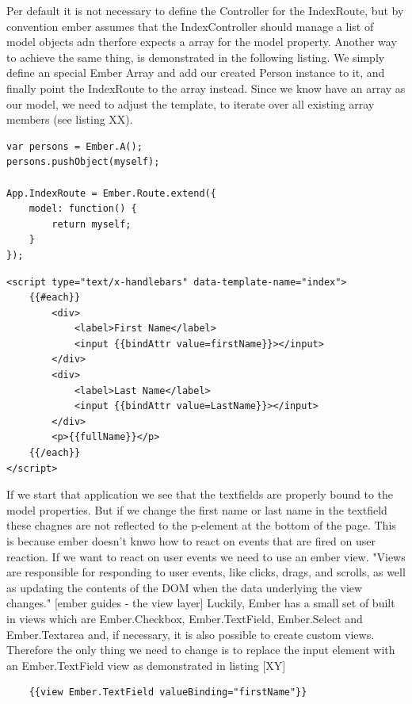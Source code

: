 Per default it is not necessary to define the Controller for the IndexRoute, but by convention ember assumes that the IndexController should manage a list of model objects adn therfore expects a array for the model property. Another way to achieve the same thing, is demonstrated in the following listing. We simply define an special Ember Array and add our created Person instance to it, and finally point the IndexRoute to the array instead. Since we know have an array as our model, we need to adjust the template, to iterate over all existing array members (see listing XX).

\begin{lstlisting}[caption=app.js]
var persons = Ember.A();
persons.pushObject(myself);

App.IndexRoute = Ember.Route.extend({
    model: function() {
        return myself;
    }
});

\end{lstlisting}     

\begin{lstlisting}[caption=index.html]
<script type="text/x-handlebars" data-template-name="index">
	{{#each}}
		<div>
			<label>First Name</label> 
			<input {{bindAttr value=firstName}}></input>
		</div>
		<div>
			<label>Last Name</label> 
			<input {{bindAttr value=LastName}}></input>
		</div>
		<p>{{fullName}}</p>
	{{/each}}
</script>
\end{lstlisting}

If we start that application we see that the textfields are properly bound to the model properties. But if we change the first name or last name in the textfield these chagnes are not reflected to the p-element at the bottom of the page. This is because ember doesn't knwo how to react on events that are fired on user reaction. If we want to react on user events we need to use an ember view. "Views are responsible for responding to user events, like clicks, drags, and scrolls, as well as updating the contents of the DOM when the data underlying the view changes." [ember guides - the view layer]
Luckily, Ember has a small set of built in views which are Ember.Checkbox, Ember.TextField, Ember.Select and Ember.Textarea and, if necessary, it is also possible to create custom views. Therefore the only thing we need to change is to replace the input element with an Ember.TextField view as demonstrated in listing [XY]

\begin{lstlisting}
	{{view Ember.TextField valueBinding="firstName"}}
\end{lstlisting}

